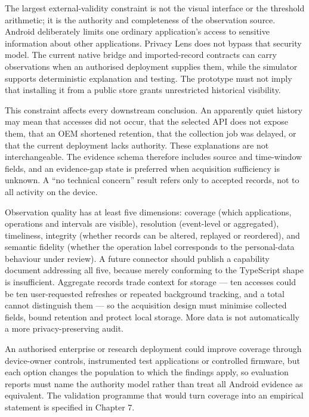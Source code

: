 The largest external-validity constraint is not the visual interface or the threshold arithmetic; it is the authority and completeness of the observation source. Android deliberately limits one ordinary application's access to sensitive information about other applications. Privacy Lens does not bypass that security model. The current native bridge and imported-record contracts can carry observations when an authorised deployment supplies them, while the simulator supports deterministic explanation and testing. The prototype must not imply that installing it from a public store grants unrestricted historical visibility.

This constraint affects every downstream conclusion. An apparently quiet history may mean that accesses did not occur, that the selected API does not expose them, that an OEM shortened retention, that the collection job was delayed, or that the current deployment lacks authority. These explanations are not interchangeable. The evidence schema therefore includes source and time-window fields, and an evidence-gap state is preferred when acquisition sufficiency is unknown. A ``no technical concern'' result refers only to accepted records, not to all activity on the device.

Observation quality has at least five dimensions: coverage (which applications, operations and intervals are visible), resolution (event-level or aggregated), timeliness, integrity (whether records can be altered, replayed or reordered), and semantic fidelity (whether the operation label corresponds to the personal-data behaviour under review). A future connector should publish a capability document addressing all five, because merely conforming to the TypeScript shape is insufficient. Aggregate records trade context for storage — ten accesses could be ten user-requested refreshes or repeated background tracking, and a total cannot distinguish them — so the acquisition design must minimise collected fields, bound retention and protect local storage. More data is not automatically a more privacy-preserving audit.

An authorised enterprise or research deployment could improve coverage through device-owner controls, instrumented test applications or controlled firmware, but each option changes the population to which the findings apply, so evaluation reports must name the authority model rather than treat all Android evidence as equivalent. The validation programme that would turn coverage into an empirical statement is specified in Chapter 7.

